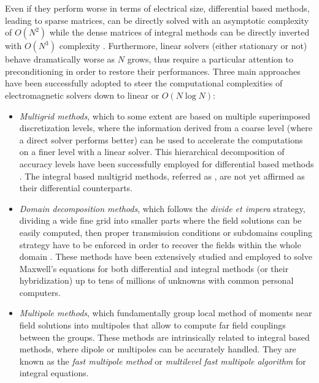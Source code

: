 Even if they perform worse in terms of electrical size, differential based methods, leading to sparse matrices, can be directly solved with an asymptotic complexity of $O(N^2)$ \cite{gupta1997design} while the dense matrices of integral methods can be directly inverted with $O(N^3)$ complexity \cite{Cormen2009}. Furthermore, linear solvers (either stationary or not) behave dramatically worse as $N$ grows, thus require a particular attention to preconditioning in order to restore their performances. Three main approaches have been successfully adopted to steer the computational complexities of electromagnetic solvers down to linear or $O(N\log N)$:
\begin{itemize}
\item \textit{Multigrid methods}, which to some extent are based on multiple superimposed discretization levels, where the information derived from a coarse level (where a direct solver performs better) can be used to accelerate the computations on a finer level with a linear solver. This hierarchical decomposition of accuracy levels have been successfully employed for differential based methods \cite{Briggs2000, hill2003stabilized, ingelstrom2004higher, gheorghe2005multigrid, zhu2006multigrid, hill2006schnelle, ingelstrom2007comparison}. The integral based multigrid methods, referred as  \cite{vipiana2005multiresolution, khorrami2010fast}, are not yet affirmed as their differential counterparts.
\item \textit{Domain decomposition methods}, which follows the \textit{divide et impera} strategy, dividing a wide fine grid into smaller parts where the field solutions can be easily computed, then proper transmission conditions or subdomains coupling strategy have to be enforced in order to recover the fields within the whole domain \cite{quarteroni1999domain, toselli2005domain, mathew2008domain} . These methods have been extensively studied and employed to solve Maxwell's equations \cite{li2006vector, sun2005nonconforming, vouvakis2007domain, rodriguez2006new, zhao2006solving, barka2007domain, zhao2008domain, rawat2008domain, grasedyck2009domain, rawat2009finite, ozgun2010iterative, peng2010non, takei2010full, peng2011integral, shao2011full, wang2012domain,widlund2007domain} for both differential and integral methods (or their hybridization) up to tens of millions of unknowns with common personal computers.
\item \textit{Multipole methods}, which fundamentally group local method of moments near field solutions into multipoles that allow to compute far field couplings between the groups. These methods are intrinsically related to integral based methods, where dipole or multipoles can be accurately handled. They are known as the \textit{fast multipole method} or \textit{multilevel fast multipole algorithm} \cite{Chew2001, Gumerov2004} for integral equations.
\end{itemize}
